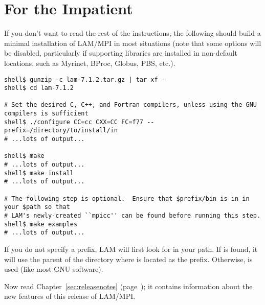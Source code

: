 %
% 
%
%


\chapter{For the Impatient}
\label{sec:quick}

If you don't want to read the rest of the instructions, the following
should build a minimal installation of LAM/MPI in most situations
(note that some options will be disabled, particularly if supporting
libraries are installed in non-default locations, such as Myrinet,
BProc, Globus, PBS, etc.).

\lstset{style=lam-cmdline}
\begin{lstlisting}
shell$ gunzip -c lam-7.1.2.tar.gz | tar xf -
shell$ cd lam-7.1.2

# Set the desired C, C++, and Fortran compilers, unless using the GNU compilers is sufficient
shell$ ./configure CC=cc CXX=CC FC=f77 --prefix=/directory/to/install/in
# ...lots of output...

shell$ make
# ...lots of output...
shell$ make install
# ...lots of output...

# The following step is optional.  Ensure that $prefix/bin is in in your $path so that
# LAM's newly-created ``mpicc'' can be found before running this step.
shell$ make examples
# ...lots of output...
\end{lstlisting}

If you do not specify a prefix, LAM will first look for  in
your path.  If  is found, it will use the parent of the
directory where  is located as the prefix.  Otherwise,
 is used (like most GNU software).

Now read Chapter~\ref{sec:releasenotes}
(page~\pageref{sec:releasenotes}); it contains information about the
new features of this release of LAM/MPI.

